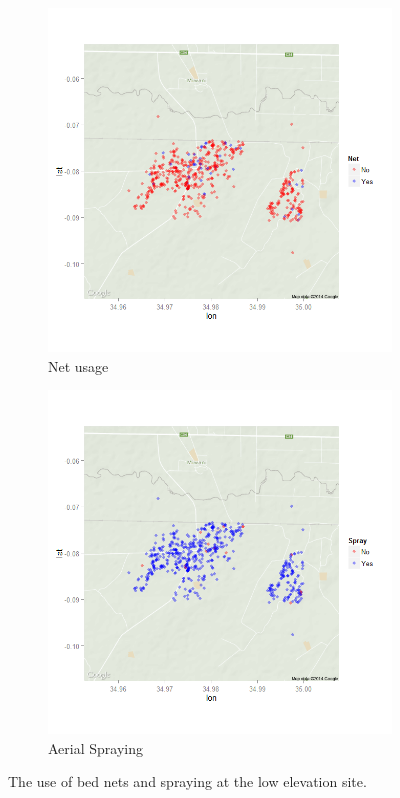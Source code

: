\documentclass{article}\usepackage[]{graphicx}\usepackage[]{color}
\begin{document}
\begin{figure}
\centering
\begin{subfigure}[b]{.48\textwidth}
\includegraphics[width=\textwidth]{./figure/Low_nets}
\caption{Net usage}
\end{subfigure}
\begin{subfigure}[b]{.48\textwidth}
\includegraphics[width=\textwidth]{./figure/Low_spray}
\caption{Aerial Spraying}
\end{subfigure}
\caption{The use of bed nets and spraying at the low elevation site.}
\label{low}
\end{figure}
\end{document}

